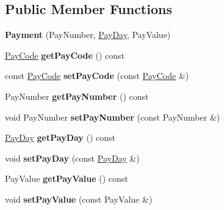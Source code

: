 \subsection*{Public Member Functions}
\begin{DoxyCompactItemize}
\item 
\hypertarget{classPayment_ad622d846e78c3c8f6ca859def1b2ad92}{{\bfseries Payment} (Pay\-Number, \hyperlink{classPayDay}{Pay\-Day}, Pay\-Value)}\label{classPayment_ad622d846e78c3c8f6ca859def1b2ad92}

\item 
\hypertarget{classPayment_a1d71998fa33e757bb350eb40895865ae}{\hyperlink{classPayCode}{Pay\-Code} {\bfseries get\-Pay\-Code} () const }\label{classPayment_a1d71998fa33e757bb350eb40895865ae}

\item 
\hypertarget{classPayment_adf458db6331e53948a473a04a0d622a4}{const \hyperlink{classPayCode}{Pay\-Code} {\bfseries set\-Pay\-Code} (const \hyperlink{classPayCode}{Pay\-Code} \&)}\label{classPayment_adf458db6331e53948a473a04a0d622a4}

\item 
\hypertarget{classPayment_aedc3924ab4e9db65b672c329d0e2f88b}{Pay\-Number {\bfseries get\-Pay\-Number} () const }\label{classPayment_aedc3924ab4e9db65b672c329d0e2f88b}

\item 
\hypertarget{classPayment_a895c7d62b503c7b27e3a2e527496f3d1}{void Pay\-Number {\bfseries set\-Pay\-Number} (const Pay\-Number \&)}\label{classPayment_a895c7d62b503c7b27e3a2e527496f3d1}

\item 
\hypertarget{classPayment_a22ee22d04f3f5757f115386aa3337c51}{\hyperlink{classPayDay}{Pay\-Day} {\bfseries get\-Pay\-Day} () const }\label{classPayment_a22ee22d04f3f5757f115386aa3337c51}

\item 
\hypertarget{classPayment_aaadd94e11ab24629d536809da691efc5}{void {\bfseries set\-Pay\-Day} (const \hyperlink{classPayDay}{Pay\-Day} \&)}\label{classPayment_aaadd94e11ab24629d536809da691efc5}

\item 
\hypertarget{classPayment_a2d5883b07cbcd31e54972c559b4a70fc}{Pay\-Value {\bfseries get\-Pay\-Value} () const }\label{classPayment_a2d5883b07cbcd31e54972c559b4a70fc}

\item 
\hypertarget{classPayment_a563cd47a5839865b9eadc8cc9e0da1b7}{void {\bfseries set\-Pay\-Value} (const Pay\-Value \&)}\label{classPayment_a563cd47a5839865b9eadc8cc9e0da1b7}

\end{DoxyCompactItemize}


